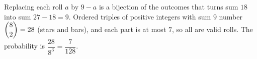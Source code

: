 Replacing each roll $a$ by $9-a$ is a bijection of the outcomes that turns sum $18$ into sum $27-18=9$. Ordered triples of positive integers with sum $9$ number $\dbinom82=28$ (stars and bars), and each part is at most $7$, so all are valid rolls. The probability is $\dfrac{28}{8^3}=\boxed{\dfrac7{128}}$.
